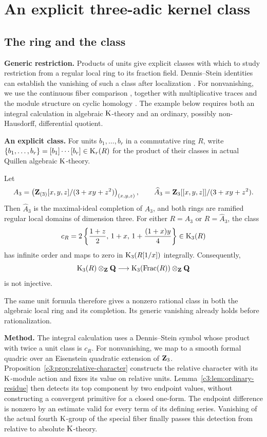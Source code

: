\section{An explicit three-adic kernel class}
\label{sec:explicit-core}
\subsection{The ring and the class}\label{c3:sec:introduction}

\medskip
\noindent\textbf{Generic restriction.}
Products of units give explicit classes with which to study restriction
from a regular local ring to its fraction field. Dennis--Stein identities
can establish the vanishing of such a class after localization
\cite[III, Definition~5.11 and Theorem~5.11.1]{Weibel}.
For nonvanishing, we use the continuous fiber comparison
\cite[Proposition~4.10]{AMMN}, together with multiplicative traces and
the module structure on cyclic homology
\cite{BGTTrace,NikolausScholze,HoyoisCircle,BokstedtOttosen}.
The example below requires both an integral calculation in algebraic
$\operatorname{K}$-theory and an ordinary, possibly non-Hausdorff, differential quotient.

\medskip
\noindent\textbf{An explicit class.}
For units $b_1,\ldots,b_r$ in a commutative ring $R$, write
$\{b_1,\ldots,b_r\}=[b_1]\cdots[b_r]\in\operatorname{K}_r(R)$ for the product of their
classes in actual Quillen algebraic $\operatorname{K}$-theory.

\begin{theorem}
\label{thm:explicit-three-dimensional}
Let
\[
 A_3=
 \left(\mathbf{Z}_{(3)}[x,y,z]/(3+xy+z^2)\right)_{(x,y,z)},
 \qquad
 \widehat A_3=\mathbf{Z}_3[[x,y,z]]/(3+xy+z^2).
\]
Then $\widehat A_3$ is the maximal-ideal completion of $A_3$, and both
rings are ramified regular local domains of dimension three.
For either $R=A_3$ or $R=\widehat A_3$, the class
\[
 c_R=
 2\left\{\frac{1+z}{2},\,1+x,\,
              1+\frac{(1+x)y}{4}\right\}\in\operatorname{K}_3(R)
\]
has infinite order and maps to zero in $\operatorname{K}_3(R[1/x])$ integrally.
Consequently,
\[
 \operatorname{K}_3(R)\otimes_{\mathbf{Z}}\mathbf{Q}
 \longrightarrow
 \operatorname{K}_3(\operatorname{Frac}(R))\otimes_{\mathbf{Z}}\mathbf{Q}
\]
is not injective.
\end{theorem}

The same unit formula therefore gives a nonzero rational class in both
the algebraic local ring and its completion. Its generic vanishing
already holds before rationalization.

\medskip
\noindent\textbf{Method.}
The integral calculation uses a Dennis--Stein symbol whose product with
twice a unit class is $c_R$.
For nonvanishing, we map to a smooth formal quadric over an Eisenstein
quadratic extension of $\mathbf{Z}_3$.
Proposition~\ref{c3:prop:relative-character} constructs the relative
character with its $\operatorname{K}$-module action and fixes its value on relative
units. Lemma~\ref{c3:lem:ordinary-residue} then detects its top component by
two endpoint values, without constructing a convergent primitive for a
closed one-form. The endpoint difference is nonzero by an estimate
valid for every term of its defining series.
Vanishing of the actual fourth $\operatorname{K}$-group of the special fiber finally
passes this detection from relative to absolute $\operatorname{K}$-theory.

